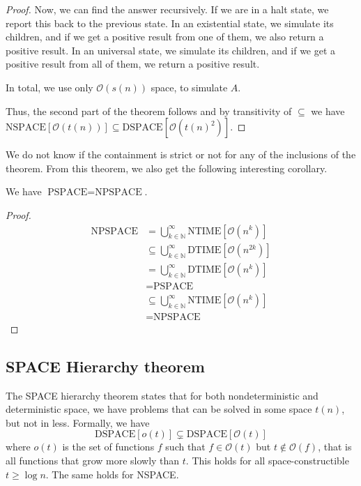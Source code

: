 \begin{proof}
    Now, we can find the answer recursively.
    If we are in a halt state, we report this back to the previous state.
    In an existential state, we simulate its children, and if we get a positive result from one of them, we also return a positive result.
    In an universal state, we simulate its children, and if we get a positive result from all of them, we return a positive result.

    In total, we use only $\mathcal{O}(s(n))$ space, to simulate $A$.

    Thus, the second part of the theorem follows and by transitivity of $\subseteq$ we have $\text{NSPACE}[\mathcal{O}(t(n))] \subseteq \text{DSPACE}[\mathcal{O}(t(n)^2)]$.
\end{proof}

We do not know if the containment is strict or not for any of the inclusions of the theorem.
From this theorem, we also get the following interesting corollary.

\begin{corollary}
    We have $\text{PSPACE} = \text{NPSPACE}$.
\end{corollary}

\begin{proof}
    \begin{align*}
        \text{NPSPACE} &= \bigcup_{k \in \mathbb{N}}^{\infty}\text{NTIME}[\mathcal{O}(n^k)] \\
        &\subseteq \bigcup_{k\in \mathbb{N}}^{\infty}\text{DTIME}[\mathcal{O}(n^{2k})] \\
        &= \bigcup_{k\in \mathbb{N}}^{\infty}\text{DTIME}[\mathcal{O}(n^{k})] \\
        &= \text{PSPACE} \\
        &\subseteq \bigcup_{k\in \mathbb{N}}^{\infty}\text{NTIME}[\mathcal{O}(n^{k})] \\
        &= \text{NPSPACE}
    \end{align*}
\end{proof}

\subsection{SPACE Hierarchy theorem}\label{subsec:space-hierarchy-theorem}

The SPACE hierarchy theorem states that for both nondeterministic and deterministic space, we have problems that can be solved in some space $t(n)$, but not in less.
Formally, we have
\[
    \text{DSPACE}[o(t)] \subsetneq \text{DSPACE}[\mathcal{O}(t)]
\]
where $o(t)$ is the set of functions $f$ such that $f \in \mathcal{O}(t)$ but $t \not \in \mathcal{O}(f)$, that is all functions that grow more slowly than $t$.
This holds for all space-constructible $t \geq \log n$.
The same holds for NSPACE.

